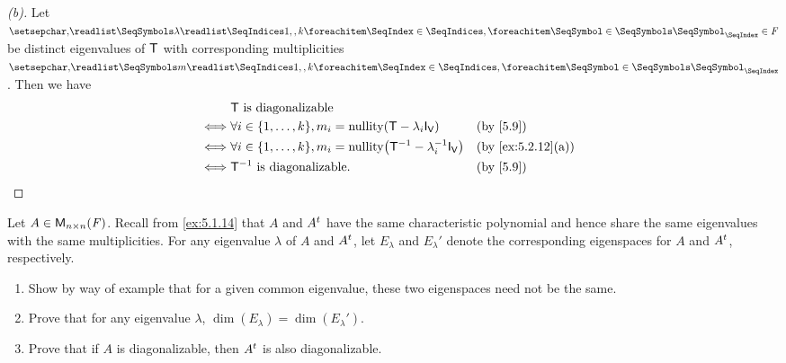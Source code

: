 \begin{proof}[(b)]
  Let \(\seq{\lambda}{1,,k} \in \F\) be distinct eigenvalues of \(\mathsf{T}\) with corresponding multiplicities \(\seq{m}{1,,k}\).
  Then we have
  \begin{align*}
         & \T \text{ is diagonalizable}                                                                                      \\
    \iff & \forall i \in \set{1, \dots, k}, m_i = \nt{\T - \lambda_i \IT[\V]}           &  & \text{(by \cref{5.9})}          \\
    \iff & \forall i \in \set{1, \dots, k}, m_i = \nt{\T^{-1} - \lambda_i^{-1} \IT[\V]} &  & \text{(by \cref{ex:5.2.12}(a))} \\
    \iff & \T^{-1} \text{ is diagonalizable}.                                           &  & \text{(by \cref{5.9})}
  \end{align*}
\end{proof}

\begin{ex}\label{ex:5.2.13}
  Let \(A \in \mathsf{M}_{{n} \times n}({\mathit{F}})\).
  Recall from \cref{ex:5.1.14} that \(A\) and \({A}^{t}\) have the same characteristic polynomial and hence share the same eigenvalues with the same multiplicities.
  For any eigenvalue \(\lambda\) of \(A\) and \({A}^{t}\), let \(E_{\lambda}\) and \(E_{\lambda}'\) denote the corresponding eigenspaces for \(A\) and \({A}^{t}\), respectively.
  \begin{enumerate}
    \item Show by way of example that for a given common eigenvalue, these two eigenspaces need not be the same.
    \item Prove that for any eigenvalue \(\lambda\), \(\dim(E_{\lambda}) = \dim(E_{\lambda}')\).
    \item Prove that if \(A\) is diagonalizable, then \({A}^{t}\) is also diagonalizable.
  \end{enumerate}
\end{ex}

